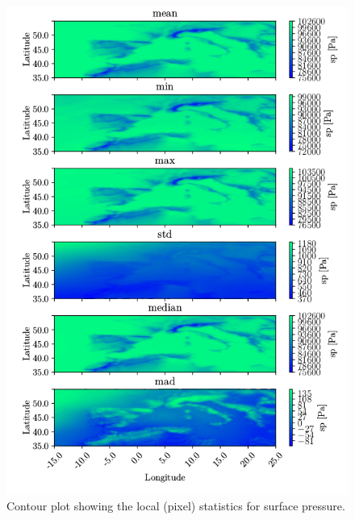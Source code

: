\begin{figure}[ht]
    \centering
    \includegraphics{python_figs/all_stat_variable_sp.png}
    \caption{Contour plot showing the local (pixel) statistics for surface pressure.}
    \label{fig:all_stats_sp}
\end{figure}

